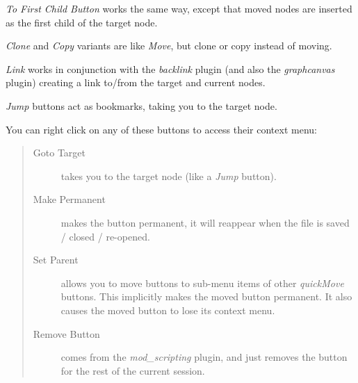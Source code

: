 \documentclass[a4paper,10pt,english]{sphinxmanual}
\begin{document}
\emph{To First Child Button} works the same way, except that moved nodes are inserted
as the first child of the target node.

\emph{Clone} and \emph{Copy} variants are like \emph{Move}, but clone or copy instead of moving.

\emph{Link} works in conjunction with the \emph{backlink} plugin (and also the
\emph{graphcanvas} plugin) creating a link to/from the target and current nodes.

\emph{Jump} buttons act as bookmarks, taking you to the target node.

You can right click on any of these buttons to access their context menu:
\begin{quote}
\begin{description}
\item[{Goto Target}] \leavevmode
takes you to the target node (like a \emph{Jump} button).

\item[{Make Permanent}] \leavevmode
makes the button permanent, it will reappear
when the file is saved / closed / re-opened.

\item[{Set Parent}] \leavevmode
allows you to move buttons to sub-menu items of other
\emph{quickMove} buttons.  This implicitly makes the moved button
permanent.  It also causes the moved button to lose its context menu.

\item[{Remove Button}] \leavevmode
comes from the \emph{mod\_scripting} plugin, and just
removes the button for the rest of the current session.

\end{description}
\end{quote}
\end{document}
